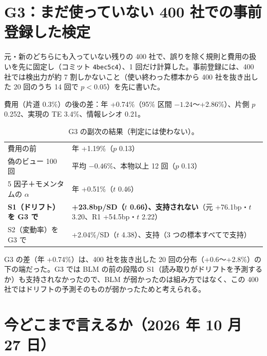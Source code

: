 \documentclass[xelatex,ja=standard,jafont=haranoaji,a4paper,10pt]{bxjsreport}
\newcommand{\code}[1]{\texttt{#1}}
\begin{document}
\section{G3：まだ使っていない 400 社での事前登録した検定}

元・新のどちらにも入っていない残りの 400 社で、誤りを除く規則と費用の扱いを先に固定し（コミット \code{4bec5c4}）、1 回だけ計算した。事前登録には、400 社では検出力が約 7 割しかないこと（使い終わった標本から 400 社を抜き出した 20 回のうち 14 回で $p < 0.05$）を先に書いた。

\begin{verdict}
費用（片道 0.3\%）の後の差：年 +0.74\%（95\% 区間 $-1.24$〜+2.86\%）、片側 $p$ 0.252、実現の TE 3.4\%、情報レシオ 0.21。
\end{verdict}

\begin{table}[H]
\centering\small
\caption{G3 の副次の結果（判定には使わない）。}
\label{tab:g3}
\begin{tabular}{p{5.0cm}p{9.0cm}}
\toprule
費用の前 & 年 +1.19\%（$p$ 0.13） \\
偽のビュー 100 回 & 平均 $-0.46\%$、本物以上 12 回（$p$ 0.13） \\
5 因子＋モメンタムの $\alpha$ & 年 +0.51\%（$t$ 0.46） \\
\textbf{S1（ドリフト）を G3 で} & \textbf{+23.8bp/SD（$t$ 0.66）、支持されない}（元 +76.1bp・$t$ 3.20、R1 +54.5bp・$t$ 2.22） \\
S2（変動率）を G3 で & +2.04\%/SD（$t$ 4.38）、支持（3 つの標本すべてで支持） \\
\bottomrule
\end{tabular}
\end{table}

G3 の差（年 +0.74\%）は、400 社を抜き出した 20 回の分布（+0.6〜+2.8\%）の下の端だった。G3 では BLM の前の段階の S1（読み取りがドリフトを予測するか）も支持されなかったので、BLM が弱かったのは組み方ではなく、この 400 社ではドリフトの予測そのものが弱かったためと考えられる。

\section{今どこまで言えるか（2026 年 10 月 27 日）}
\end{document}
